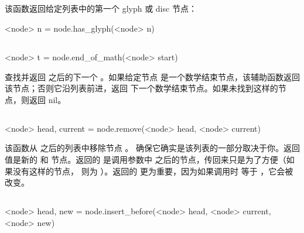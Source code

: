 \subsection{}


该函数返回给定列表中的第一个 glyph 或 disc 节点：

\begin{typing}
<node> n =
    node.has_glyph(<node> n)
\end{typing}

\subsection{}


\begin{typing}
<node> t =
    node.end_of_math(<node> start)
\end{typing}

查找并返回  之后的下一个 。如果给定节点
是一个数学结束节点，该辅助函数返回该节点；否则它沿列表前进，返回
下一个数学结束节点。如果未找到这样的节点，则返回 nil。

\subsection{}


\begin{typing}
<node> head, current =
    node.remove(<node> head, <node> current)
\end{typing}

该函数从  之后的列表中移除节点 。
确保它确实是该列表的一部分取决于你。返回值是新的  和
 节点。返回的  是调用参数中
 之后的节点，传回来只是为了方便（如果没有这样的节点，
则为 ）。返回的  更为重要，因为如果调用时
 等于 ，它会被改变。

\subsection{}


\begin{typing}
<node> head, new =
    node.insert_before(<node> head, <node> current, <node> new)
\end{typing}

